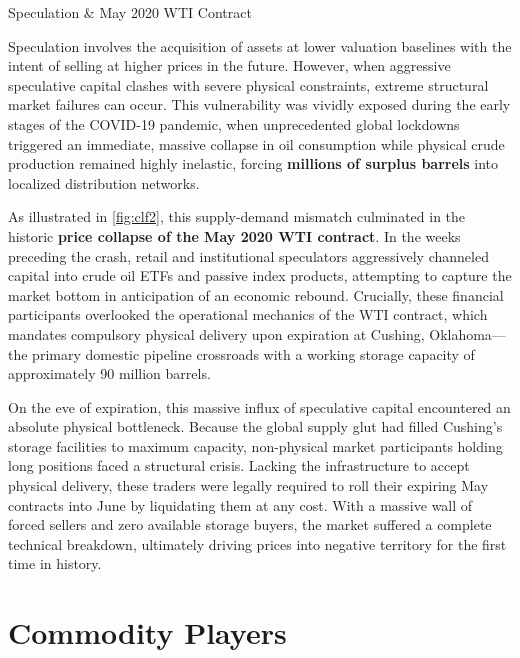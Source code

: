 \documentclass[10pt]{article}
\begin{document}
    \begin{core}[label=core:speculation]{Speculation \& May 2020 WTI Contract}

      Speculation involves the acquisition of assets at lower valuation baselines with the intent of selling at higher prices in the future. However, when aggressive speculative capital clashes with severe physical constraints, extreme structural market failures can occur. This vulnerability was vividly exposed during the early stages of the COVID-19 pandemic, when unprecedented global lockdowns triggered an immediate, massive collapse in oil consumption while physical crude production remained highly inelastic, forcing \textbf{millions of surplus barrels} into localized distribution networks.


      As illustrated in \autoref{fig:clf2}, this supply-demand mismatch culminated in the historic \textbf{price collapse of the May 2020 WTI contract}. In the weeks preceding the crash, retail and institutional speculators aggressively channeled capital into crude oil ETFs and passive index products, attempting to capture the market bottom in anticipation of an economic rebound. Crucially, these financial participants overlooked the operational mechanics of the WTI contract, which mandates compulsory physical delivery upon expiration at Cushing, Oklahoma---the primary domestic pipeline crossroads with a working storage capacity of approximately 90 million barrels.

      On the eve of expiration, this massive influx of speculative capital encountered an absolute physical bottleneck. Because the global supply glut had filled Cushing's storage facilities to maximum capacity, non-physical market participants holding long positions faced a structural crisis. Lacking the infrastructure to accept physical delivery, these traders were legally required to roll their expiring May contracts into June by liquidating them at any cost. With a massive wall of forced sellers and zero available storage buyers, the market suffered a complete technical breakdown, ultimately driving prices into negative territory for the first time in history.

    \end{core}

\section{Commodity Players}
\end{document}
